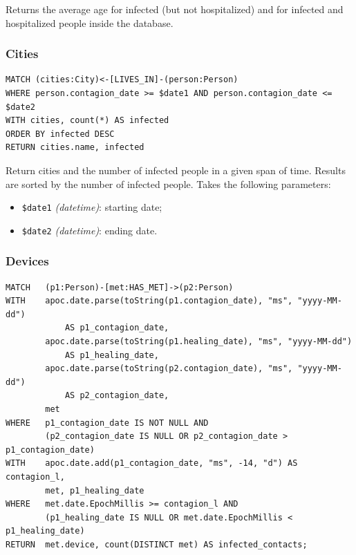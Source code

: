 \documentclass[12pt, a4paper]{article}
\begin{document}
\noindent %
Returns the average age for infected (but not hospitalized) and for infected 
and hospitalized people inside the database.

\subsubsection{Cities}

\begin{tcolorbox}[fontupper=\scriptsize]
    \begin{verbatim}
MATCH (cities:City)<-[LIVES_IN]-(person:Person) 
WHERE person.contagion_date >= $date1 AND person.contagion_date <= $date2
WITH cities, count(*) AS infected
ORDER BY infected DESC
RETURN cities.name, infected
    \end{verbatim}
\end{tcolorbox}

\noindent %
Return cities and the number of infected people in a given span of time. Results are sorted by the number of infected people. 
Takes the following parameters: 
\begin{itemize}
    \item \texttt{\$date1} \emph{(datetime)}: starting date;
    \item \texttt{\$date2} \emph{(datetime)}: ending date.
\end{itemize}

\subsubsection{Devices}

\begin{tcolorbox}[fontupper=\scriptsize]
    \begin{verbatim}
MATCH   (p1:Person)-[met:HAS_MET]->(p2:Person)
WITH    apoc.date.parse(toString(p1.contagion_date), "ms", "yyyy-MM-dd") 
            AS p1_contagion_date,
        apoc.date.parse(toString(p1.healing_date), "ms", "yyyy-MM-dd") 
            AS p1_healing_date,
        apoc.date.parse(toString(p2.contagion_date), "ms", "yyyy-MM-dd") 
            AS p2_contagion_date,
        met
WHERE   p1_contagion_date IS NOT NULL AND
        (p2_contagion_date IS NULL OR p2_contagion_date > p1_contagion_date)
WITH    apoc.date.add(p1_contagion_date, "ms", -14, "d") AS contagion_l,
        met, p1_healing_date
WHERE   met.date.EpochMillis >= contagion_l AND
        (p1_healing_date IS NULL OR met.date.EpochMillis < p1_healing_date)
RETURN  met.device, count(DISTINCT met) AS infected_contacts;
    \end{verbatim}
\end{tcolorbox}
\end{document}
